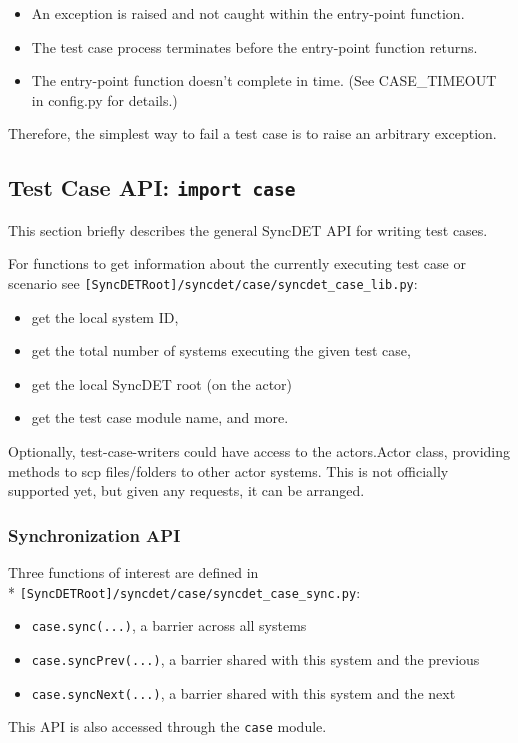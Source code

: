 \begin{itemize}
\item An exception is raised and not caught within the entry-point function.
\item The test case process terminates before the entry-point function returns.
\item The entry-point function doesn't complete in time. (See CASE\_TIMEOUT
in config.py for details.)
\end{itemize}

Therefore, the simplest way to fail a test case is to raise an arbitrary exception.

\subsection{Test Case API: {\tt import case}} 

This section briefly describes the general SyncDET API for writing test cases.
 
For functions to get information about the currently executing test case or
scenario see {\tt [SyncDETRoot]/syncdet/case/syncdet\_case\_lib.py}:
\begin{itemize}
\item get the local system ID, 
\item get the total number of systems executing the given test case, 
\item get the local SyncDET root (on the actor)
\item get the test case module name, and more.
\end{itemize}

Optionally, test-case-writers could have access to the actors.Actor class,
providing methods to scp files/folders to other actor systems. This is not
officially supported yet, but given any requests, it can be arranged.

\subsubsection{Synchronization API}

Three functions of interest are defined in \\*
{\tt [SyncDETRoot]/syncdet/case/syncdet\_case\_sync.py}:
\begin{itemize}
\item {\tt case.sync(...)}, a barrier across all systems
\item {\tt case.syncPrev(...)}, a barrier shared with this system and the previous
\item {\tt case.syncNext(...)}, a barrier shared with this system and the next
\end{itemize}
This API is also accessed through the {\tt case} module.


